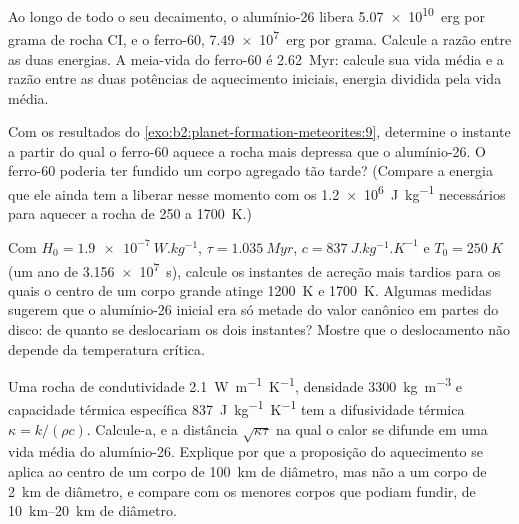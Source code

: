 \begin{exercise}[$\star\star$]\label{exo:b2:planet-formation-meteorites:9}
Ao longo de todo o seu decaimento, o alumínio-26 libera \qty{5.07e10}{erg} por grama de rocha
CI, e o ferro-60, \qty{7.49e7}{erg} por grama. Calcule a razão entre as duas
energias. A meia-vida do ferro-60 é \qty{2.62}{Myr}: calcule sua vida média
e a razão entre as duas potências de aquecimento iniciais, energia dividida pela vida média.
\end{exercise}

\begin{exercise}[$\star\star\star$]\label{exo:b2:planet-formation-meteorites:10}
Com os resultados do \cref{exo:b2:planet-formation-meteorites:9}, determine o instante a partir do qual o ferro-60 aquece a rocha
mais depressa que o alumínio-26. O ferro-60 poderia ter fundido um corpo agregado tão
tarde? (Compare a energia que ele ainda tem a liberar nesse momento com os
\qty{1.2e6}{J.kg^{-1}} necessários para aquecer a rocha de \num{250} a \qty{1700}{K}.)
\end{exercise}

\begin{exercise}[$\star\star\star$]\label{exo:b2:planet-formation-meteorites:11}
Com $H_0 = \qty{1.9e-7}{W.kg^{-1}}$, $\tau = \qty{1.035}{Myr}$,
$c = \qty{837}{J.kg^{-1}.K^{-1}}$ e $T_0 = \qty{250}{K}$ (um ano de
\qty{3.156e7}{s}), calcule os instantes de acreção mais tardios para os quais o centro de um
corpo grande atinge \qty{1200}{K} e \qty{1700}{K}. Algumas medidas sugerem que
o alumínio-26 inicial era só metade do valor canônico em partes do disco:
de quanto se deslocariam os dois instantes? Mostre que o deslocamento não depende da
temperatura crítica.
\end{exercise}

\begin{exercise}[$\star\star\star$]\label{exo:b2:planet-formation-meteorites:12}
Uma rocha de condutividade \qty{2.1}{W.m^{-1}.K^{-1}}, densidade
\qty{3300}{kg.m^{-3}} e capacidade térmica específica \qty{837}{J.kg^{-1}.K^{-1}} tem
a difusividade térmica $\kappa = k/(\rho c)$. Calcule-a, e a distância
$\sqrt{\kappa\tau}$ na qual o calor se difunde em uma vida média do alumínio-26.
Explique por que a proposição do aquecimento se aplica ao centro de um corpo
de \qty{100}{km} de diâmetro, mas não a um corpo de \qty{2}{km} de diâmetro, e compare com os
menores corpos que podiam fundir, de \qtyrange{10}{20}{km} de diâmetro.
\end{exercise}


